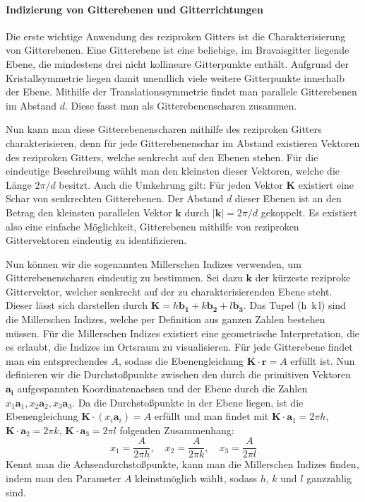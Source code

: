 \paragraph{Indizierung von Gitterebenen und Gitterrichtungen}
Die erste wichtige Anwendung des reziproken Gitters ist die Charakterisierung von Gitterebenen. Eine Gitterebene 
ist eine beliebige, im Bravaisgitter liegende Ebene, die mindestens drei nicht kollineare Gitterpunkte enthält.
Aufgrund der Kristallsymmetrie liegen damit unendlich viele weitere Gitterpunkte innerhalb der Ebene. Mithilfe 
der Translationssymmetrie findet man parallele Gitterebenen im Abstand $d$. Diese fasst man als Gitterebenenscharen 
zusammen.

Nun kann man diese Gitterebenenscharen mithilfe des reziproken Gitters charakterisieren, denn für jede 
Gitterebenenschar im Abstand  existieren Vektoren des reziproken Gitters, welche senkrecht auf den Ebenen stehen. 
Für die eindeutige Beschreibung wählt man den kleinsten dieser Vektoren, welche die Länge $2 \pi / d$ besitzt. Auch
die Umkehrung gilt: Für jeden Vektor $\mathbf{K}$ existiert eine Schar von senkrechten Gitterebenen. 
Der Abstand $d$ dieser Ebenen ist an den Betrag den kleinsten parallelen Vektor $\mathbf{k}$ durch $\lvert \mathbf{k} \rvert=2\pi  /d$ gekoppelt. Es existiert also eine einfache Möglichkeit, Gitterebenen mithilfe von reziproken 
Gittervektoren eindeutig zu identifizieren. \autocite[113]{Ashcroft}

Nun können wir die sogenannten Millerschen Indizes verwenden, um Gitterebenenscharen eindeutig zu bestimmen. Sei 
dazu $\mathbf{k}$  der kürzeste reziproke Gittervektor, welcher senkrecht auf der zu charakterisierenden Ebene steht. Dieser 
lässt sich darstellen durch $ \mathbf{K} = h \mathbf{b_1} + k \mathbf{b_2} + l \mathbf{b_3}$. Das Tupel (h\, k\,l) sind 
die Millerschen Indizes, welche per Definition aus ganzen Zahlen 
bestehen müssen. Für die Millerschen Indizes existiert eine geometrische Interpretation, die es erlaubt, die 
Indizes im Ortsraum zu visualisieren. Für jede Gitterebene findet man ein entsprechendes $A$, sodass  die 
Ebenengleichung $\mathbf{K} \cdot \mathbf{r} = A$ erfüllt ist. Nun definieren wir die Durchstoßpunkte zwischen den 
durch die primitiven Vektoren $\mathbf{a_i}$ aufgespannten Koordinatenachsen und der Ebene durch die Zahlen 
$x_{1}\mathbf{a}_{1}, x_{2}\mathbf{a}_{2}, x_{3}\mathbf{a}_{3}$. Da die Durchstoßpunkte in der Ebene liegen, 
ist die Ebenengleichung $\mathbf{K}\cdot(x_{i}\mathbf{a}_{i})=A$ erfüllt und man findet mit $\mathbf{K}\cdot
\mathbf{a}_{1}=2\pi h$, $\mathbf{K}\cdot \mathbf{a}_{2}=2\pi k$,  $ \mathbf{K}\cdot \mathbf{a}_{3}=2\pi l$  
folgenden Zusammenhang:
\begin{equation*}
	x_{1}=\frac{A}{2\pi h}, \quad x_{2}=\frac{A}{2\pi k}, \quad x_{3} =\frac{A}{2\pi l}
\end{equation*}
Kennt man die Achsendurchstoßpunkte, kann man die Millerschen Indizes finden, indem man den Parameter $A$ 
kleinstmöglich wählt, sodass $h$, $k$ und $l$ ganzzahlig sind. \autocite[115]{Ashcroft}

